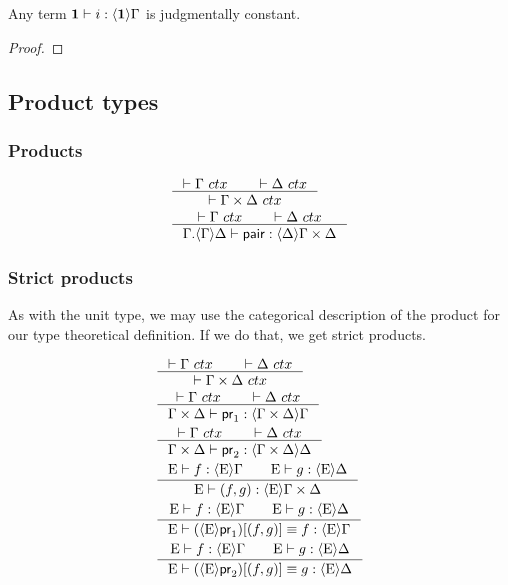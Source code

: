 \begin{lem}
Any term $\jhom{\unit}{\Gamma}{i}$ is judgmentally constant.
\end{lem}

\begin{proof}

\end{proof}

\subsection{Product types}

\subsubsection{Products}
\begin{align}
& \inference{\jctx{\Gamma}\qquad\jctx{\Delta}}{\jctx{\product{\Gamma}{\Delta}}}\\
& \inference{\jctx{\Gamma}\qquad\jctx{\Delta}}{\jhom{{\Gamma}{\Delta}}{\product{\Gamma}{\Delta}}{\pair}}
\end{align}

\subsubsection{Strict products}
As with the unit type, we may use the categorical description of the product
for our type theoretical definition. If we do that, we get strict products.

\begin{align}
& \inference{\jctx{\Gamma}\qquad\jctx{\Delta}}{\jctx{\product{\Gamma}{\Delta}}}\\
& \inference{\jctx{\Gamma}\qquad\jctx{\Delta}}{\jhom{\product{\Gamma}{\Delta}}{\Gamma}{\proj1}}\\
& \inference{\jctx{\Gamma}\qquad\jctx{\Delta}}{\jhom{\product{\Gamma}{\Delta}}{\Delta}{\proj2}}\\
& \inference{\jhom{\greek{E}}{\Gamma}{f}\qquad\jhom{\greek{E}}{\Delta}{g}}
          {\jhom{\greek{E}}{\product{\Gamma}{\Delta}}{\pairp{f,g}}}\\
& \inference{\jhom{\greek{E}}{\Gamma}{f}\qquad\jhom{\greek{E}}{\Delta}{g}}
          {\jhomeq{\greek{E}}{\Gamma}{\jcomp{\greek{E}}{\pairp{f,g}}{\proj1}}{f}}\\
& \inference{\jhom{\greek{E}}{\Gamma}{f}\qquad\jhom{\greek{E}}{\Delta}{g}}
          {\jhomeq{\greek{E}}{\Delta}{\jcomp{\greek{E}}{\pairp{f,g}}{\proj2}}{g}}
\end{align}

